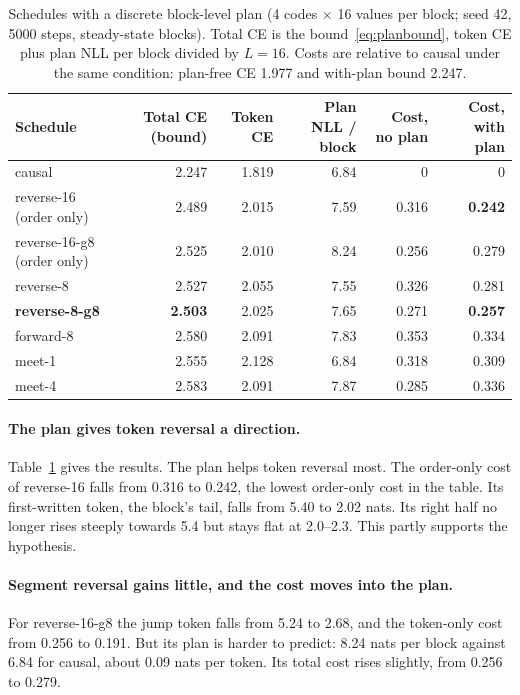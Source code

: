 \documentclass[11pt]{article}
\theoremstyle{definition}
\theoremstyle{remark}
\newcommand{\sch}[1]{\textsf{#1}}
\begin{document}
\begin{table}[t]
  \centering
  \caption{Schedules with a discrete block-level plan (4 codes $\times$ 16 values per block; seed 42, 5000 steps, steady-state blocks). Total CE is the bound~\eqref{eq:planbound}, token CE plus plan NLL per block divided by $L=16$. Costs are relative to \sch{causal} under the same condition: plan-free CE 1.977 and with-plan bound 2.247.}
  \label{tab:plan}
  \small
  \begin{tabular}{lrrrrr}
    \toprule
    Schedule & Total CE (bound) & Token CE & Plan NLL / block & Cost, no plan & Cost, with plan \\
    \midrule
    \sch{causal}                      & 2.247 & 1.819 & 6.84 & 0     & 0 \\
    \sch{reverse-16} (order only)     & 2.489 & 2.015 & 7.59 & 0.316 & \textbf{0.242} \\
    \sch{reverse-16-g8} (order only)  & 2.525 & 2.010 & 8.24 & 0.256 & 0.279 \\
    \midrule
    \sch{reverse-8}                   & 2.527 & 2.055 & 7.55 & 0.326 & 0.281 \\
    \textbf{\sch{reverse-8-g8}}       & \textbf{2.503} & 2.025 & 7.65 & 0.271 & \textbf{0.257} \\
    \sch{forward-8}                   & 2.580 & 2.091 & 7.83 & 0.353 & 0.334 \\
    \sch{meet-1}                      & 2.555 & 2.128 & 6.84 & 0.318 & 0.309 \\
    \sch{meet-4}                      & 2.583 & 2.091 & 7.87 & 0.285 & 0.336 \\
    \bottomrule
  \end{tabular}
\end{table}

\paragraph{The plan gives token reversal a direction.}
Table~\ref{tab:plan} gives the results.
The plan helps token reversal most.
The order-only cost of \sch{reverse-16} falls from 0.316 to 0.242, the lowest order-only cost in the table.
Its first-written token, the block's tail, falls from 5.40 to 2.02 nats.
Its right half no longer rises steeply towards 5.4 but stays flat at 2.0--2.3.
This partly supports the hypothesis.

\paragraph{Segment reversal gains little, and the cost moves into the plan.}
For \sch{reverse-16-g8} the jump token falls from 5.24 to 2.68, and the token-only cost from 0.256 to 0.191.
But its plan is harder to predict: 8.24 nats per block against 6.84 for \sch{causal}, about 0.09 nats per token.
Its total cost rises slightly, from 0.256 to 0.279.
\end{document}

